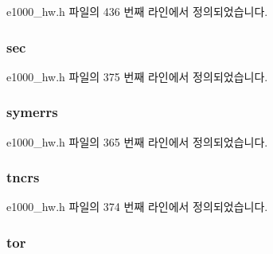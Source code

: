 e1000\+\_\+hw.\+h 파일의 436 번째 라인에서 정의되었습니다.

\subsubsection[{\texorpdfstring{sec}{sec}}]{ sec}\hypertarget{structe1000__hw__stats_acc3ab40d907e4cef68a6d92d5bc3ca69}{}\label{structe1000__hw__stats_acc3ab40d907e4cef68a6d92d5bc3ca69}


e1000\+\_\+hw.\+h 파일의 375 번째 라인에서 정의되었습니다.

\subsubsection[{\texorpdfstring{symerrs}{symerrs}}]{ symerrs}\hypertarget{structe1000__hw__stats_a98c824de7ee35d5569092a27dff44ca1}{}\label{structe1000__hw__stats_a98c824de7ee35d5569092a27dff44ca1}


e1000\+\_\+hw.\+h 파일의 365 번째 라인에서 정의되었습니다.

\subsubsection[{\texorpdfstring{tncrs}{tncrs}}]{ tncrs}\hypertarget{structe1000__hw__stats_a73ddfa80b10207b1571b90a9511c9a4c}{}\label{structe1000__hw__stats_a73ddfa80b10207b1571b90a9511c9a4c}


e1000\+\_\+hw.\+h 파일의 374 번째 라인에서 정의되었습니다.

\subsubsection[{\texorpdfstring{tor}{tor}}]{ tor}\hypertarget{structe1000__hw__stats_a31e3b0d862659a133493874cdbd16f14}{}\label{structe1000__hw__stats_a31e3b0d862659a133493874cdbd16f14}


